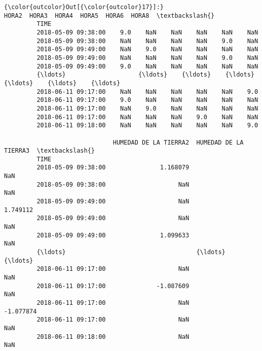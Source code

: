 \documentclass[11pt]{article}
\begin{document}
\begin{Verbatim}[commandchars=\\\{\}]
{\color{outcolor}Out[{\color{outcolor}17}]:}                      HORA2  HORA3  HORA4  HORA5  HORA6  HORA8  \textbackslash{}
         TIME                                                            
         2018-05-09 09:38:00    9.0    NaN    NaN    NaN    NaN    NaN   
         2018-05-09 09:38:00    NaN    NaN    NaN    NaN    9.0    NaN   
         2018-05-09 09:49:00    NaN    9.0    NaN    NaN    NaN    NaN   
         2018-05-09 09:49:00    NaN    NaN    NaN    NaN    9.0    NaN   
         2018-05-09 09:49:00    9.0    NaN    NaN    NaN    NaN    NaN   
         {\ldots}                    {\ldots}    {\ldots}    {\ldots}    {\ldots}    {\ldots}    {\ldots}   
         2018-06-11 09:17:00    NaN    NaN    NaN    NaN    NaN    9.0   
         2018-06-11 09:17:00    9.0    NaN    NaN    NaN    NaN    NaN   
         2018-06-11 09:17:00    NaN    9.0    NaN    NaN    NaN    NaN   
         2018-06-11 09:17:00    NaN    NaN    NaN    9.0    NaN    NaN   
         2018-06-11 09:18:00    NaN    NaN    NaN    NaN    NaN    9.0   
         
                              HUMEDAD DE LA TIERRA2  HUMEDAD DE LA TIERRA3  \textbackslash{}
         TIME                                                                
         2018-05-09 09:38:00               1.168079                    NaN   
         2018-05-09 09:38:00                    NaN                    NaN   
         2018-05-09 09:49:00                    NaN               1.749112   
         2018-05-09 09:49:00                    NaN                    NaN   
         2018-05-09 09:49:00               1.099633                    NaN   
         {\ldots}                                    {\ldots}                    {\ldots}   
         2018-06-11 09:17:00                    NaN                    NaN   
         2018-06-11 09:17:00              -1.087609                    NaN   
         2018-06-11 09:17:00                    NaN              -1.077874   
         2018-06-11 09:17:00                    NaN                    NaN   
         2018-06-11 09:18:00                    NaN                    NaN   
         

\end{Verbatim}
\end{document}
